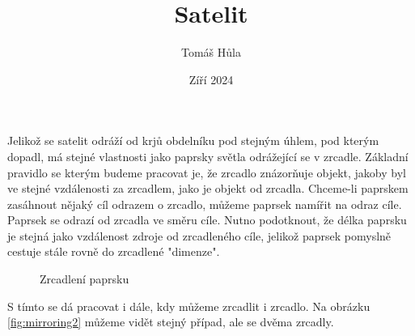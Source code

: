 \documentclass[11pt, a4paper]{article}
\title{Satelit}
\author{Tomáš Hůla}
\date{Zíří 2024}
\begin{document}
    \maketitle

    Jelikož se satelit odráží od krjů obdelníku pod stejným úhlem, pod kterým dopadl, má stejné vlastnosti jako paprsky světla odrážející se v zrcadle.
    Základní pravidlo se kterým budeme pracovat je, že zrcadlo znázorňuje objekt, jakoby byl ve stejné vzdálenosti za zrcadlem, jako je objekt od zrcadla.
    Chceme-li paprskem zasáhnout nějaký cíl odrazem o zrcadlo, můžeme paprsek namířit na odraz cíle.
    Paprsek se odrazí od zrcadla ve směru cíle.
    Nutno podotknout, že délka paprsku je stejná jako vzdálenost zdroje od zrcadleného cíle, jelikož paprsek pomyslně cestuje stále rovně do zrcadlené "dimenze".

    \begin{figure}[h]
        \centering
        \caption{Zrcadlení paprsku}
        \label{fig:mirroring1}
    \end{figure}

    S tímto se dá pracovat i dále, kdy můžeme zrcadlit i zrcadlo.
    Na obrázku \ref{fig:mirroring2} můžeme vidět stejný případ, ale se dvěma zrcadly.
\end{document}
